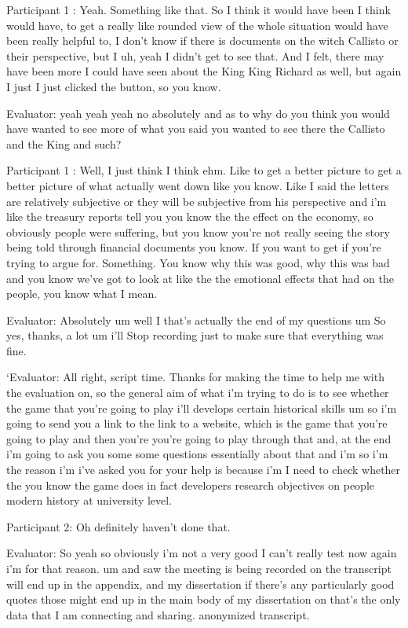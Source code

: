 \documentclass{l4proj}
\begin{document}
\begin{appendices}
Participant 1 : Yeah. Something like that. So I think it would have been I think would have, to get a really like rounded view of the whole situation would have been really helpful to, I don't know if there is documents on the witch Callisto or their perspective, but I uh, yeah I didn't get to see that. And I felt, there may have been more I could have seen about the King King Richard as well, but again I just I just clicked the button, so you know.

Evaluator: yeah yeah yeah no absolutely and as to why do you think you would have wanted to see more of what you said you wanted to see there the Callisto and the King and such?

Participant 1 : Well, I just think I think ehm. Like to get a better picture to get a better picture of what actually went down like you know. Like I said the letters are relatively subjective or they will be subjective from his perspective and i'm like the treasury reports tell you you know the the effect on the economy, so obviously people were suffering, but you know you’re not really seeing the story being told through financial documents you know. If you want to get if you're trying to argue for. Something. You know why this was good, why this was bad and you know we've got to look at like the the emotional effects that had on the people, you know what I mean.

Evaluator: Absolutely um well I that's actually the end of my questions um So yes, thanks, a lot um i'll Stop recording just to make sure that everything was fine.


`Evaluator: All right, script time. Thanks for making the time to help me with the evaluation on, so the general aim of what i'm trying to do is to see whether the game that you're going to play i'll develops certain historical skills um so i'm going to send you a link to the link to a website, which is the game that you're going to play and then you're you're going to play through that and, at the end i'm going to ask you some some questions essentially about that and i'm so i'm the reason i'm i've asked you for your help is because i'm I need to check whether the you know the game does in fact developers research objectives on people modern history at university level.

Participant 2: Oh definitely haven't done that.

Evaluator: So yeah so obviously i'm not a very good I can't really test now again i'm for that reason. um and saw the meeting is being recorded on the transcript will end up in the appendix, and my dissertation if there's any particularly good quotes those might end up in the main body of my dissertation on that's the only data that I am connecting and sharing. anonymized transcript. 


\end{appendices}
\end{document}
